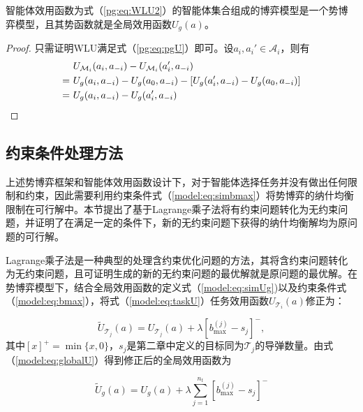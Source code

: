 \begin{proposition}[WLU可行性]
\label{pg:pro:mwlu}
	智能体效用函数为式（\ref{pg:eq:WLU2}）的智能体集合组成的博弈模型是一个势博弈模型，且其势函数就是全局效用函数$U_g(a)$。
	
	\begin{proof}
	只需证明WLU满足式（\ref{pg:eq:pgU}）即可。设$a_i,a_i' \in \mathcal{A}_i$，则有
	\begin{align}
		&\ U_{\mathcal{M}_i}(a_i,a_{-i}) - U_{\mathcal{M}_i}(a_i',a_{-i})\notag\\
		=&\ U_g(a_i,a_{-i}) - U_g(a_0,a_{-i}) - [U_g(a_i',a_{-i}) - U_g(a_0,a_{-i})]\notag\\
		=&\ U_g(a_i,a_{-i}) - U_g(a_i',a_{-i}) \notag
	\end{align}
	\end{proof}
\end{proposition}



\subsection{约束条件处理方法}
\label{pg:mwlu}

上述势博弈框架和智能体效用函数设计下，对于智能体选择任务并没有做出任何限制和约束，因此需要利用约束条件式（\ref{model:eq:simbmax}）将势博弈的纳什均衡限制在可行解中。本节提出了基于Lagrange乘子法将有约束问题转化为无约束问题，并证明了在满足一定的条件下，新的无约束问题下获得的纳什均衡解均为原问题的可行解。

Lagrange乘子法是一种典型的处理含约束优化问题的方法，其将含约束问题转化为无约束问题，且可证明生成的新的无约束问题的最优解就是原问题的最优解。在势博弈模型下，结合全局效用函数的定义式（\ref{model:eq:simUg})以及约束条件式（\ref{model:eq:bmax}），将式（\ref{model:eq:taskU}）任务效用函数$U_{\mathcal{T}_i}(a)$修正为：

\begin{equation}
\label{pg:eq:newTaskU}
	\widetilde U_{\mathcal{T}_j}(a) = U_{\mathcal{T}_j}(a) + \lambda [b_{\text{max}}^{(j)} - s_j]^-,
\end{equation}
其中$[x]^+=\min\{x,0\}$，$s_j$是第二章中定义的目标同为$\mathcal{T}_j$的导弹数量。由式（\ref{model:eq:globalU}）得到修正后的全局效用函数为

\begin{equation}
\label{pg:eq:newglobalU}
		\widetilde U_g(a) = U_g(a) +  \lambda \sum_{j=1}^{n_t}[b_{\text{max}}^{(j)} - s_j]^-
	\end{equation}


